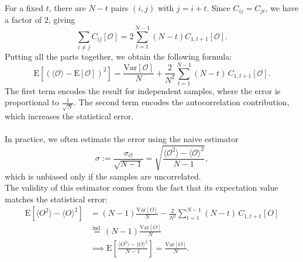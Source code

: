 For a fixed $t$, there are $N - t$ pairs $(i, j)$ with $j = i + t$. Since $C_{ij} = C_{ji}$, we have a factor of $2$, giving
\begin{equation}
    \sum_{i \neq j} C_{ij}[\mathcal{O}] = 2 \sum_{t = 1}^{N-1} (N- t) C_{1, t+1}[\mathcal{O}]. 
\end{equation}
Putting all the parts together, we obtain the following formula: 
\begin{equation}
    \text{E}\left[ \left( \langle \mathcal{O} \rangle - \text{E}[ \mathcal{O} ] \right)^{2} \right] = \frac{\text{Var}[ \mathcal{O} ]}{N} + \frac{2}{N^{2}} \sum_{t = 1}^{N - 1} (N - t) \, C_{1, t + 1}[ \mathcal{O} ]. 
\end{equation}
The first term encodes the result for independent samples, where the error is proportional to $\frac{1}{\sqrt{N}}$. The second term encodes the autocorrelation contribution, which increases the statistical error. \\\\
In practice, we often estimate the error using the naive estimator
\begin{equation}
    \sigma := \frac{\sigma_{\mathcal{O}}}{\sqrt{N - 1}} = \sqrt{\frac{\langle \mathcal{O}^{2} \rangle - \langle \mathcal{O} \rangle^{2}}{N - 1}},
\end{equation}
which is unbiased only if the samples are uncorrelated. \\
The validity of this estimator comes from the fact that its expectation value matches the statistical error:
\begin{equation}
    \begin{aligned}
        \text{E}\left[ \langle O^{2} \rangle - \langle O \rangle^{2} \right]
        & =
        (N - 1) \frac{\text{Var}[O]}{N} - \frac{2}{N^{2}} \sum_{t = 1}^{N - 1} (N - t) \, C_{1, t + 1}[O] \\
        &
        \overset{\text{ind.}}{=} (N - 1) \frac{\text{Var}[O]}{N} \\
        &
        \implies \text{E}\left[ \frac{\langle O^{2} \rangle - \langle O \rangle^{2}}{N - 1} \right] = \frac{\text{Var}[O]}{N}.
    \end{aligned}
\end{equation}
\cite{wiki:mcmc,wiki:stderr,favaro:ml_lecture}
